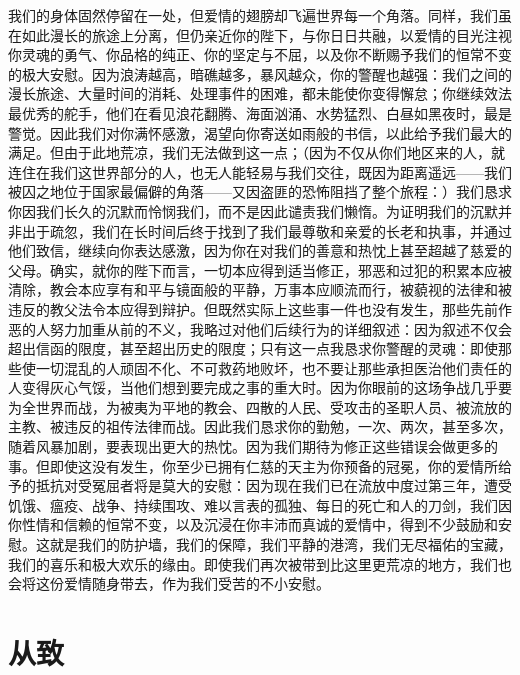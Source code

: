 我们的身体固然停留在一处，但爱情的翅膀却飞遍世界每一个角落。同样，我们虽在如此漫长的旅途上分离，但仍亲近你的陛下，与你日日共融，以爱情的目光注视你灵魂的勇气、你品格的纯正、你的坚定与不屈，以及你不断赐予我们的恒常不变的极大安慰。因为浪涛越高，暗礁越多，暴风越众，你的警醒也越强：我们之间的漫长旅途、大量时间的消耗、处理事件的困难，都未能使你变得懈怠；你继续效法最优秀的舵手，他们在看见浪花翻腾、海面汹涌、水势猛烈、白昼如黑夜时，最是警觉。因此我们对你满怀感激，渴望向你寄送如雨般的书信，以此给予我们最大的满足。但由于此地荒凉，我们无法做到这一点；（因为不仅从你们地区来的人，就连住在我们这世界部分的人，也无人能轻易与我们交往，既因为距离遥远——我们被囚之地位于国家最偏僻的角落——又因盗匪的恐怖阻挡了整个旅程：）我们恳求你因我们长久的沉默而怜悯我们，而不是因此谴责我们懒惰。为证明我们的沉默并非出于疏忽，我们在长时间后终于找到了我们最尊敬和亲爱的长老和执事，并通过他们致信，继续向你表达感激，因为你在对我们的善意和热忱上甚至超越了慈爱的父母。确实，就你的陛下而言，一切本应得到适当修正，邪恶和过犯的积累本应被清除，教会本应享有和平与镜面般的平静，万事本应顺流而行，被藐视的法律和被违反的教父法令本应得到辩护。但既然实际上这些事一件也没有发生，那些先前作恶的人努力加重从前的不义，我略过对他们后续行为的详细叙述：因为叙述不仅会超出信函的限度，甚至超出历史的限度；只有这一点我恳求你警醒的灵魂：即使那些使一切混乱的人顽固不化、不可救药地败坏，也不要让那些承担医治他们责任的人变得灰心气馁，当他们想到要完成之事的重大时。因为你眼前的这场争战几乎要为全世界而战，为被夷为平地的教会、四散的人民、受攻击的圣职人员、被流放的主教、被违反的祖传法律而战。因此我们恳求你的勤勉，一次、两次，甚至多次，随着风暴加剧，要表现出更大的热忱。因为我们期待为修正这些错误会做更多的事。但即使这没有发生，你至少已拥有仁慈的天主为你预备的冠冕，你的爱情所给予的抵抗对受冤屈者将是莫大的安慰：因为现在我们已在流放中度过第三年，遭受饥饿、瘟疫、战争、持续围攻、难以言表的孤独、每日的死亡和人的刀剑，我们因你性情和信赖的恒常不变，以及沉浸在你丰沛而真诚的爱情中，得到不少鼓励和安慰。这就是我们的防护墙，我们的保障，我们平静的港湾，我们无尽福佑的宝藏，我们的喜乐和极大欢乐的缘由。即使我们再次被带到比这里更荒凉的地方，我们也会将这份爱情随身带去，作为我们受苦的不小安慰。\par


\section{从致}

